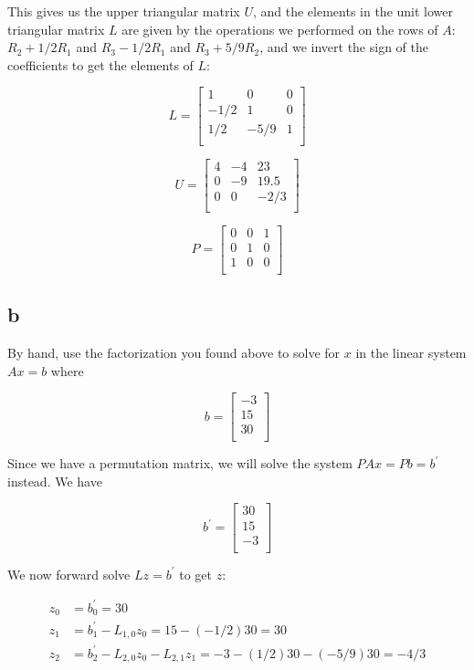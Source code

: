 \documentclass[11pt]{article}
\begin{document}
This gives us the upper triangular matrix $U$, and the elements in the unit lower triangular matrix $L$ are given by the operations we performed on the rows of $A$: $R_2 + 1/2 R_1$ and $R_3 - 1/2 R_1$ and $R_3 + 5/9 R_2$, and we invert the sign of the coefficients to get the elements of $L$:

\[L = \begin{bmatrix}
  1 & 0 & 0 \\
  -1/2 & 1 & 0 \\
  1/2 & -5/9 & 1 \\
\end{bmatrix}\]

\[U = \begin{bmatrix}
  4 & -4 & 23 \\
  0 & -9 & 19.5 \\
  0 & 0 & -2/3 \\
\end{bmatrix}\]

\[P = \begin{bmatrix}
  0 & 0 & 1 \\
  0 & 1 & 0 \\
  1 & 0 & 0 \\
\end{bmatrix}\]

\subsection{b}

By hand, use the factorization you found above to solve for $x$ in the linear system $Ax = b$ where

\[b = \begin{bmatrix}
  -3 \\
  15 \\
  30 \\
\end{bmatrix}\]

Since we have a permutation matrix, we will solve the system $PAx = Pb = b^\prime$ instead. We have

\[b^\prime = \begin{bmatrix}
  30 \\
  15 \\
  -3 \\
\end{bmatrix}\]

We now forward solve $Lz = b^\prime$ to get $z$:

\begin{align*}
  z_0 &= b^\prime_0 = 30 \\
  z_1 &= b^\prime_1 - L_{1,0} z_0 = 15 - (-1/2) 30 = 30 \\
  z_2 &= b^\prime_2 - L_{2,0} z_0 - L_{2,1} z_1 = -3 - (1/2) 30 - (-5/9) 30 = -4/3 \\  
\end{align*}
\end{document}
